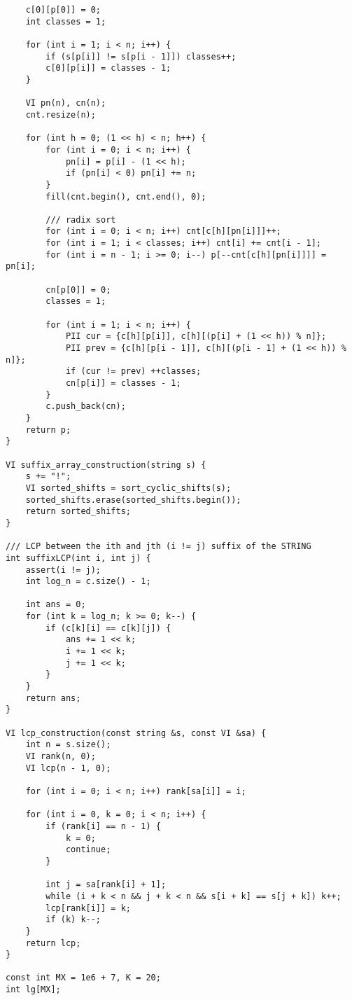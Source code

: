 \documentclass[FSZ,a4paper,onesided]{article}
\begin{document}
\begin{multicols*}{\COLS}
\begin{lstlisting}
    c[0][p[0]] = 0;
    int classes = 1;

    for (int i = 1; i < n; i++) {
        if (s[p[i]] != s[p[i - 1]]) classes++;
        c[0][p[i]] = classes - 1;
    }

    VI pn(n), cn(n);
    cnt.resize(n);

    for (int h = 0; (1 << h) < n; h++) {
        for (int i = 0; i < n; i++) {
            pn[i] = p[i] - (1 << h);
            if (pn[i] < 0) pn[i] += n;
        }
        fill(cnt.begin(), cnt.end(), 0);

        /// radix sort
        for (int i = 0; i < n; i++) cnt[c[h][pn[i]]]++;
        for (int i = 1; i < classes; i++) cnt[i] += cnt[i - 1];
        for (int i = n - 1; i >= 0; i--) p[--cnt[c[h][pn[i]]]] = pn[i];

        cn[p[0]] = 0;
        classes = 1;

        for (int i = 1; i < n; i++) {
            PII cur = {c[h][p[i]], c[h][(p[i] + (1 << h)) % n]};
            PII prev = {c[h][p[i - 1]], c[h][(p[i - 1] + (1 << h)) % n]};
            if (cur != prev) ++classes;
            cn[p[i]] = classes - 1;
        }
        c.push_back(cn);
    }
    return p;
}

VI suffix_array_construction(string s) {
    s += "!";
    VI sorted_shifts = sort_cyclic_shifts(s);
    sorted_shifts.erase(sorted_shifts.begin());
    return sorted_shifts;
}

/// LCP between the ith and jth (i != j) suffix of the STRING
int suffixLCP(int i, int j) {
    assert(i != j);
    int log_n = c.size() - 1;

    int ans = 0;
    for (int k = log_n; k >= 0; k--) {
        if (c[k][i] == c[k][j]) {
            ans += 1 << k;
            i += 1 << k;
            j += 1 << k;
        }
    }
    return ans;
}

VI lcp_construction(const string &s, const VI &sa) {
    int n = s.size();
    VI rank(n, 0);
    VI lcp(n - 1, 0);

    for (int i = 0; i < n; i++) rank[sa[i]] = i;

    for (int i = 0, k = 0; i < n; i++) {
        if (rank[i] == n - 1) {
            k = 0;
            continue;
        }

        int j = sa[rank[i] + 1];
        while (i + k < n && j + k < n && s[i + k] == s[j + k]) k++;
        lcp[rank[i]] = k;
        if (k) k--;
    }
    return lcp;
}

const int MX = 1e6 + 7, K = 20;
int lg[MX];


\end{lstlisting}
\end{multicols*}
\end{document}

